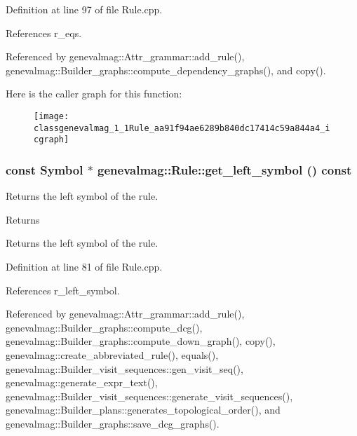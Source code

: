 Definition at line 97 of file Rule.cpp.



References r\_\-eqs.



Referenced by genevalmag::Attr\_\-grammar::add\_\-rule(), genevalmag::Builder\_\-graphs::compute\_\-dependency\_\-graphs(), and copy().



Here is the caller graph for this function:\nopagebreak
\begin{figure}[H]
\begin{center}
\leavevmode
\texttt{[image: classgenevalmag\_1\_1Rule\_aa91f94ae6289b840dc17414c59a844a4\_icgraph]}
\end{center}
\end{figure}


\hypertarget{classgenevalmag_1_1Rule_a4d67205ef292350a440a10f7bbdda0e1}{
\subsubsection[{get\_\-left\_\-symbol}]{\setlength{\rightskip}{0pt plus 5cm}const {\bf Symbol} $\ast$ genevalmag::Rule::get\_\-left\_\-symbol () const}}
\label{classgenevalmag_1_1Rule_a4d67205ef292350a440a10f7bbdda0e1}
Returns the left symbol of the rule. \begin{DoxyReturn}{Returns}

\end{DoxyReturn}
Returns the left symbol of the rule. 

Definition at line 81 of file Rule.cpp.



References r\_\-left\_\-symbol.



Referenced by genevalmag::Attr\_\-grammar::add\_\-rule(), genevalmag::Builder\_\-graphs::compute\_\-dcg(), genevalmag::Builder\_\-graphs::compute\_\-down\_\-graph(), copy(), genevalmag::create\_\-abbreviated\_\-rule(), equals(), genevalmag::Builder\_\-visit\_\-sequences::gen\_\-visit\_\-seq(), genevalmag::generate\_\-expr\_\-text(), genevalmag::Builder\_\-visit\_\-sequences::generate\_\-visit\_\-sequences(), genevalmag::Builder\_\-plans::generates\_\-topological\_\-order(), and genevalmag::Builder\_\-graphs::save\_\-dcg\_\-graphs().



